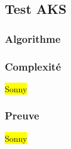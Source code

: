 \subsection{Test AKS}


	\subsubsection{Algorithme}
		
	\subsubsection{Complexité}
		\colorbox{yellow}{Sonny}
	
	\subsubsection{Preuve}
		\colorbox{yellow}{Sonny}